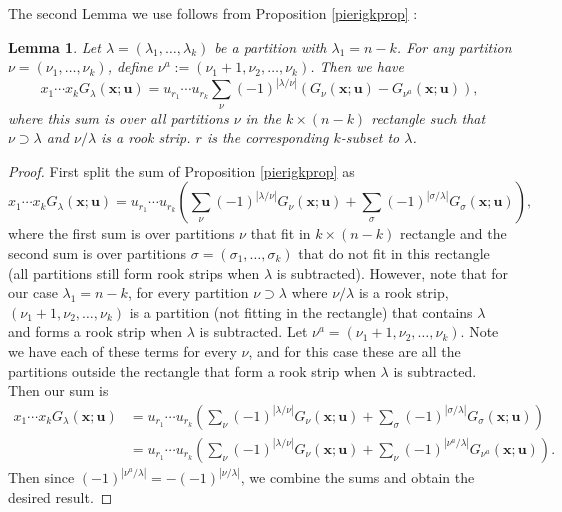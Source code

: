 \documentclass[12pt]{article}
\newtheorem{lemma}[theorem]{Lemma}%
\theoremstyle{plain}
\theoremstyle{definition}
\newcommand{\xb}{\boldsymbol{x}}
\newcommand{\ub}{\boldsymbol{u}}
\begin{document}
The second Lemma we use follows from Proposition \ref{pierigkprop} :
\begin{lemma}\label{gkpieri}
    Let $\lambda=(\lambda_1,\dots, \lambda_k)$ be a partition with $\lambda_1 = n-k$. For any partition $\nu=(\nu_1,\dots,\nu_k)$, define $\nu^a := (\nu_1+1,\nu_2,\dots,\nu_k)$. Then we have
    \begin{equation*}
        x_1\cdots x_k G_\lambda (\xb;\ub)  = u_{r_1}\cdots u_{r_k}\sum \limits_{\nu} (-1)^{|\lambda / \nu|} \left( G_\nu(\xb;\ub) -G_{\nu^a}(\xb;\ub)\right),
    \end{equation*}
    where this sum is over all partitions $\nu$ in the $k\times (n-k)$ rectangle such that $\nu \supset \lambda$ and $\nu/\lambda$ is a rook strip. $r$ is the corresponding $k$-subset to $\lambda$.
\end{lemma}
\begin{proof}
    First split the sum of Proposition \ref{pierigkprop} as
    \begin{equation*}
        x_1\cdots x_k G_\lambda(\xb;\ub)  = u_{r_1}\cdots u_{r_k}\left(\sum \limits_{\nu} (-1)^{|\lambda / \nu|} G_\nu (\xb;\ub)+\sum_\sigma (-1)^{|\sigma/\lambda|}G_{\sigma}(\xb ;\ub)\right),
    \end{equation*}
    where the first sum is over partitions $\nu$ that fit in $k\times (n-k)$ rectangle and the second sum is over partitions $\sigma=(\sigma_1,\dots,\sigma_k)$ that do not fit in this rectangle (all partitions still form rook strips when $\lambda$ is subtracted). However, note that for our case $\lambda_1=n-k$, for every partition $\nu\supset \lambda$ where $\nu/\lambda$ is a rook strip, $(\nu_1+1,\nu_2,\dots,\nu_k)$ is a partition (not fitting in the rectangle) that contains $\lambda$ and forms a rook strip when $\lambda$ is subtracted. Let $\nu^a=(\nu_1+1,\nu_2,\dots,\nu_k)$. Note we have each of these terms for every $\nu$, and for this case these are all the partitions outside the rectangle that form a rook strip when $\lambda$ is subtracted. Then our sum is
    \begin{align*}
        x_1\cdots x_k G_\lambda(\xb;\ub)  &= u_{r_1}\cdots u_{r_k}\left(\sum \limits_{\nu} (-1)^{|\lambda / \nu|} G_\nu(\xb;\ub) +\sum_\sigma (-1)^{|\sigma/\lambda|}G_{\sigma}(\xb;\ub)\right)\\
        &= u_{r_1}\cdots u_{r_k}\left(\sum \limits_{\nu} (-1)^{|\lambda / \nu|} G_\nu(\xb;\ub) +\sum_\nu (-1)^{|\nu^a/\lambda|}G_{\nu^a}(\xb;\ub)\right).
    \end{align*}
    Then since $(-1)^{|\nu^a/\lambda|}=-(-1)^{|\nu/\lambda|}$, we combine the sums and obtain the desired result.\end{proof}
\end{document}
